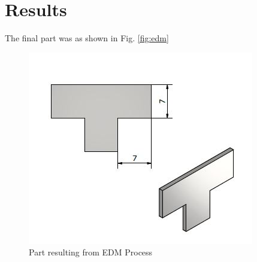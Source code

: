 \chapter{Results}
The final part was as shown in Fig. \ref{fig:edm}
\begin{center}
	\begin{figure}[!h]
	\centering
	\includegraphics{Figures/edm cut}
	\caption[Final part]{Part resulting from EDM Process}
	\label{fig;edm}
	\end{figure}
\end{center}